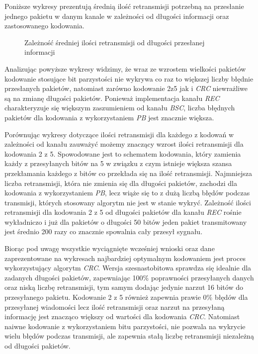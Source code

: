 \documentclass{article}
\begin{document}
\newpage

\noindent
Poniższe wykresy prezentują średnią ilość retransmisji potrzebną na przesłanie jednego pakietu w danym kanale w zależności od długości informacji oraz zastosowanego kodowania.


\begin{figure}[h!]
\centering
{}
\qquad 
{}
\caption{Zależność średniej ilości retransmisji od długości przesłanej informacji}
\end{figure}

\noindent
Analizując powyższe wykresy widzimy, że wraz ze wzrostem wielkości pakietów kodowanie stosujące bit parzystości nie wykrywa co raz to większej liczby błędnie przesłanych pakietów, natomiast zarówno kodowanie 2z5 jak i \textit{CRC} niewrażliwe są na zmianę długości pakietów. Ponieważ implementacja kanału \textit{REC} charakteryzuje się większym zaszumieniem od kanału \textit{BSC}, liczba błędnych pakietów dla kodowania z wykorzystaniem \textit{PB} jest znacznie większa.

Porównując wykresy dotyczące ilości retransmisji dla każdego z kodowań w zależności od kanału zauważyć możemy znaczący wzrost ilości retransmisji dla kodowania 2 z 5. Spowodowane jest to schematem kodowania, który zamienia każdy z przesyłanych bitów na 5 w związku z czym istnieje większa szansa przekłamania każdego z bitów co przekłada się na ilość retransmisji. Najmniejsza liczba retransmisji, która nie zmienia się dla długości pakietów, zachodzi dla kodowania z wykorzystaniem \textit{PB}, lecz wiąże się to z dużą liczbą błędów podczas transmisji, których stosowany algorytm nie jest w stanie wykryć. Zależność ilości retransmisji dla kodowania 2 z 5 od długości pakietów dla kanału \textit{REC} rośnie wykładniczo i już dla pakietów o długości 50 bitów jeden pakiet transmitowany jest średnio 200 razy co znacznie spowalnia cały przesył sygnału.

Biorąc pod uwagę wszystkie wyciągnięte wcześniej wnioski oraz dane zaprezentowane na wykresach najbardziej optymalnym kodowaniem jest proces wykorzystujący algorytm \textit{CRC}. Wersja szesnastobitowa sprawdza się idealnie dla zadanych długości pakietów, zapewniając 100\% poprawności przesyłanych danych oraz niską liczbę retransmisji, tym samym dodając jedynie narzut 16 bitów do przesyłanego pakietu. Kodowanie 2 z 5 również zapewnia prawie 0\% błędów dla przesyłanej wiadomości lecz ilość retransmisji oraz narzut na przesyłaną informację jest znacząco większy od wartości dla kodowania \textit{CRC}. Natomiast naiwne kodowanie z wykorzystaniem bitu parzystości, nie pozwala na wykrycie wielu błędów podczas transmisji, ale zapewnia stałą liczbę retransmisji niezależną od długości pakietów.
\end{document}
